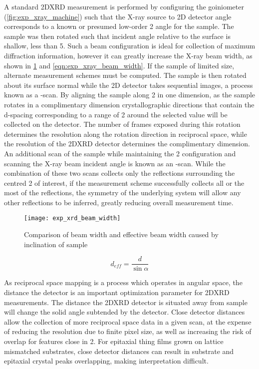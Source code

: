 A standard 2DXRD measurement is performed by configuring the goiniometer (\cref{fig:exp_xray_machine}) such that the X-ray source to 2D detector angle corresponds to a known or presumed low-order 2\straighttheta{} angle for the sample.
The sample was then rotated such that incident angle relative to the surface is shallow, less than 5\degree{}.
Such a beam configuration is ideal for collection of maximum diffraction information, however it can greatly increase the X-ray beam width, as shown in \cref{fig:exp_xray_beam_width} and \cref{eqn:exp_xray_beam_width}.
If the sample of limited size, alternate measurement schemes must be computed.
The sample is then rotated about its surface normal while the 2D detector takes sequential images, a process known as a \textphi{}-scan.
By aligning the sample along 2\straighttheta{} in one dimension, as the sample rotates in a complimentary dimension crystallographic directions that contain the d-spacing corresponding to a range of 2\straighttheta{} around the selected value will be collected on the detector.
The number of frames exposed during this rotation determines the resolution along the rotation direction in reciprocal space, while the resolution of the 2DXRD detector determines the complimentary dimension.
An additional scan of the sample while maintaining the 2\straighttheta{} configuration and scanning the X-ray beam incident angle is known as an \textomega{}-scan.
While the combination of these two scans collects only the reflections surrounding the centred 2\straighttheta{} of interest, if the measurement scheme successfully collects all or the most of the reflections, the symmetry of the underlying system will allow any other reflections to be inferred, greatly reducing overall measurement time.
\begin{figure}
 \centering \texttt{[image: exp\_xrd\_beam\_width]}
 \caption[X-Ray Beam Width]{\label{fig:exp_xray_beam_width}Comparison of beam width and effective beam width caused by inclination of sample}
\end{figure}
\begin{equation}
 d_{eff} = \frac{d}{\sin{\alpha}} \label{eqn:exp_xray_beam_width}
\end{equation}

As reciprocal space mapping is a process which operates in angular space, the distance the detector is an important optimization parameter for 2DXRD measurements.
The distance the 2DXRD detector is situated away from sample will change the solid angle subtended by the detector.
Close detector distances allow the collection of more reciprocal space data in a given scan, at the expense of reducing the resolution due to finite pixel size, as well as increasing the risk of overlap for features close in 2\straighttheta{}.
For epitaxial thing films grown on lattice mismatched substrates, close detector distances can result in substrate and epitaxial crystal peaks overlapping, making interpretation difficult.

